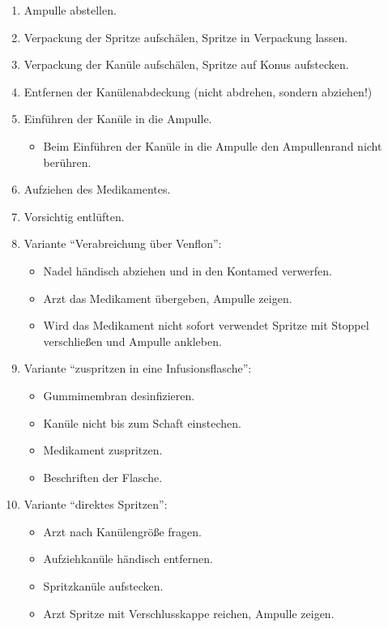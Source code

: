 \begin{enumerate}
\begin{itemize}
\begin{itemize}
{      }
    \end{itemize}
    \item Plastikampulle,
    "`Dreh-und-Drink"'-Verschluss:
    \begin{itemize}
      \item Den Verschlussknopf ohne Kontamination des Ampullenhalses
      (Sollbruchstelle) abdrehen.
    \end{itemize}
  \end{itemize}
  \item Ampulle abstellen.
  \item Verpackung der Spritze aufschälen, Spritze in Verpackung lassen.
  \item Verpackung der Kanüle aufschälen, Spritze auf Konus aufstecken.
  \item Entfernen der Kanülenabdeckung (nicht abdrehen, sondern
  abziehen!)
  \item Einführen der Kanüle in die Ampulle.
  \begin{itemize}
    \item Beim Einführen der Kanüle in die Ampulle den Ampullenrand
    nicht berühren.
  \end{itemize}
  \item Aufziehen des Medikamentes.
  \item Vorsichtig entlüften.
  \item Variante "`Verabreichung über Venflon"':
  \begin{itemize}
    \item Nadel händisch abziehen und in den Kontamed verwerfen.
    \item Arzt das Medikament übergeben, Ampulle zeigen.
    \item Wird das Medikament nicht sofort verwendet Spritze mit
    Stoppel verschließen und Ampulle ankleben.
  \end{itemize}
  \item Variante "`zuspritzen in eine Infusionsflasche"':
  \begin{itemize}
    \item Gummimembran desinfizieren.
    \item Kanüle nicht bis zum Schaft einstechen.
    \item Medikament zuspritzen.
    \item Beschriften der Flasche.
  \end{itemize}
  \item Variante "`direktes Spritzen"':
  \begin{itemize}
    \item Arzt nach Kanülengröße fragen.
    \item Aufziehkanüle händisch entfernen.
    \item Spritzkanüle aufstecken.
    \item Arzt Spritze mit Verschlusskappe reichen, Ampulle zeigen.
  \end{itemize}
\end{enumerate}

